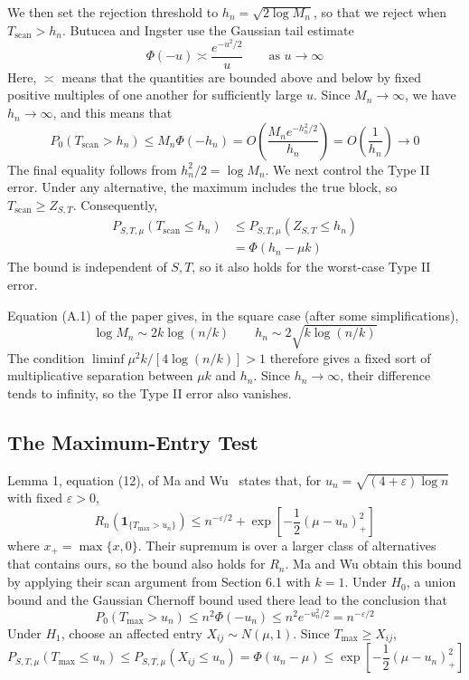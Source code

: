 \documentclass[12pt]{article}
\begin{document}
We then set the rejection threshold to $h_n=\sqrt{2\log M_n}$, so that we
reject when $T_{\mathrm{scan}}>h_n$. Butucea and Ingster use the Gaussian
tail estimate
\[
\Phi(-u)\asymp\frac{e^{-u^2/2}}{u}
\qquad\text{as }u\to\infty
\]
Here, $\asymp$ means that the quantities are bounded above and below
by fixed positive multiples of one another for sufficiently large
$u$. Since $M_n\to\infty$, we have $h_n\to\infty$, and this means that
\[
P_0(T_{\mathrm{scan}}>h_n)
\leq M_n\Phi(-h_n)
=O\left(\frac{M_ne^{-h_n^2/2}}{h_n}\right)
=O\left(\frac1{h_n}\right)\longrightarrow0
\]
The final equality follows from $h_n^2/2=\log M_n$. 
We next control the Type II error. Under any alternative, the maximum
includes the true block, so $T_{\mathrm{scan}}\geq Z_{S,T}$.
Consequently,
\begin{align*}
P_{S,T,\mu}(T_{\mathrm{scan}}\leq h_n)
&\leq P_{S,T,\mu}(Z_{S,T}\leq h_n)\\
&=\Phi(h_n-\mu k)
\end{align*}
The bound is independent of $S,T$, so it also holds for the worst-case
Type II error.

Equation (A.1) of the paper gives, in the square case (after some simplifications),
\[
\log M_n\sim2k\log(n/k)
\qquad h_n\sim2\sqrt{k\log(n/k)}
\]
The condition $\liminf\mu^2k/[4\log(n/k)]>1$ therefore gives a fixed
sort of multiplicative separation between $\mu k$ and $h_n$. Since
$h_n\to\infty$, their difference tends to infinity, so the Type II
error also vanishes. 

\subsection{The Maximum-Entry Test}\label{app:max}

Lemma 1, equation (12), of Ma and Wu~\cite{MW2015} states that, for
$u_n=\sqrt{(4+\varepsilon)\log n}$ with fixed $\varepsilon>0$,
\[
R_n\!\left(\mathbf{1}_{\{T_{\mathrm{max}}>u_n\}}\right)
\leq n^{-\varepsilon/2}
+\exp\left[-\frac12(\mu-u_n)_+^2\right]
\]
where $x_+=\max\{x,0\}$. Their supremum is over a larger class of
alternatives that contains ours, so the bound also holds for $R_n$.
Ma and Wu obtain this bound by applying their scan argument from
Section 6.1 with $k=1$.
Under $H_0$, a union bound and the Gaussian Chernoff bound used
there lead to the conclusion that
\[
P_0(T_{\mathrm{max}}>u_n)
\leq n^2\Phi(-u_n)
\leq n^2e^{-u_n^2/2}
=n^{-\varepsilon/2}
\]
Under $H_1$, choose an affected entry $X_{ij}\sim N(\mu,1)$.
Since $T_{\mathrm{max}}\geq X_{ij}$,
\[
P_{S,T,\mu}(T_{\mathrm{max}}\leq u_n)
\leq P_{S,T,\mu}(X_{ij}\leq u_n)
=\Phi(u_n-\mu)
\leq\exp\left[-\frac12(\mu-u_n)_+^2\right]
\]
\end{document}
